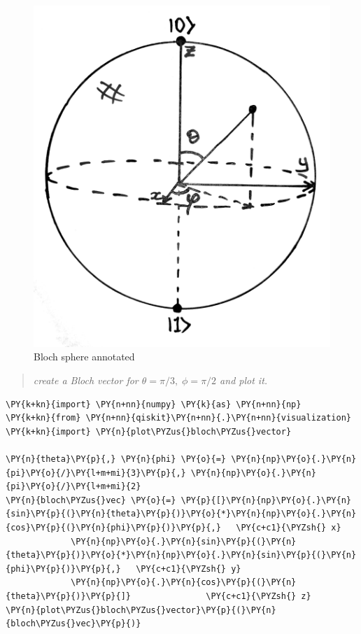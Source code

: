\begin{figure}
\centering
\includegraphics{figures/blochsphere.png}
\caption{Bloch sphere annotated}
\end{figure}

\begin{quote}
\emph{create a Bloch vector for \(\theta=\pi/3,\;\phi=\pi/2\) and plot
it.}
\end{quote}

    \begin{tcolorbox}[breakable, size=fbox, boxrule=1pt, pad at break*=1mm,colback=cellbackground, colframe=cellborder]
\begin{Verbatim}[commandchars=\\\{\}]
\PY{k+kn}{import} \PY{n+nn}{numpy} \PY{k}{as} \PY{n+nn}{np}
\PY{k+kn}{from} \PY{n+nn}{qiskit}\PY{n+nn}{.}\PY{n+nn}{visualization} \PY{k+kn}{import} \PY{n}{plot\PYZus{}bloch\PYZus{}vector}

\PY{n}{theta}\PY{p}{,} \PY{n}{phi} \PY{o}{=} \PY{n}{np}\PY{o}{.}\PY{n}{pi}\PY{o}{/}\PY{l+m+mi}{3}\PY{p}{,} \PY{n}{np}\PY{o}{.}\PY{n}{pi}\PY{o}{/}\PY{l+m+mi}{2}
\PY{n}{bloch\PYZus{}vec} \PY{o}{=} \PY{p}{[}\PY{n}{np}\PY{o}{.}\PY{n}{sin}\PY{p}{(}\PY{n}{theta}\PY{p}{)}\PY{o}{*}\PY{n}{np}\PY{o}{.}\PY{n}{cos}\PY{p}{(}\PY{n}{phi}\PY{p}{)}\PY{p}{,}   \PY{c+c1}{\PYZsh{} x}
             \PY{n}{np}\PY{o}{.}\PY{n}{sin}\PY{p}{(}\PY{n}{theta}\PY{p}{)}\PY{o}{*}\PY{n}{np}\PY{o}{.}\PY{n}{sin}\PY{p}{(}\PY{n}{phi}\PY{p}{)}\PY{p}{,}   \PY{c+c1}{\PYZsh{} y}
             \PY{n}{np}\PY{o}{.}\PY{n}{cos}\PY{p}{(}\PY{n}{theta}\PY{p}{)}\PY{p}{]}               \PY{c+c1}{\PYZsh{} z}
\PY{n}{plot\PYZus{}bloch\PYZus{}vector}\PY{p}{(}\PY{n}{bloch\PYZus{}vec}\PY{p}{)}
\end{Verbatim}
\end{tcolorbox}
 
